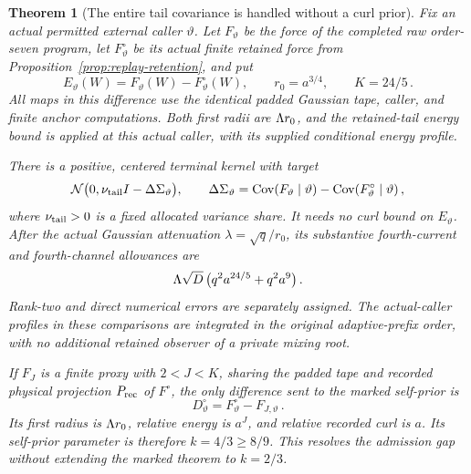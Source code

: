 \documentclass[11pt]{article}
\numberwithin{equation}{section}
\newtheorem{theorem}{Theorem}[section]
\theoremstyle{remark}\newtheorem{remark}[theorem]{Remark}
\newcommand{\N}{\mathcal N}\newcommand{\Cov}{\operatorname{Cov}}
\begin{document}
\begin{theorem}[The entire tail covariance is handled without a curl prior]
\label{thm:tail-admission}
Fix an actual permitted external caller $\vartheta$. Let $F_\vartheta$
be the force of the completed raw order-seven program, let
$F^\circ_\vartheta$ be its actual finite retained force from
Proposition~\ref{prop:replay-retention}, and put
\[
 E_\vartheta(W)=F_\vartheta(W)-F^\circ_\vartheta(W),\qquad
 r_0=a^{3/4},\qquad K=24/5\,.
\]
All maps in this difference use the identical padded Gaussian tape,
caller, and finite anchor computations. Both first radii are
$\Lambda r_0$, and the retained-tail energy bound is applied at this
actual caller, with its supplied conditional energy profile.

There is a positive, centered terminal kernel with target
\begin{equation}\label{eq:tail-cov-target}
 \N\bigl(0,\nu_{\rm tail}I-\Delta\Sigma_\vartheta\bigr),
 \qquad
 \Delta\Sigma_\vartheta
 =\Cov(F_\vartheta\mid\vartheta)
       -\Cov(F^\circ_\vartheta\mid\vartheta)\,,
\end{equation}
where $\nu_{\rm tail}>0$ is a fixed allocated variance share.
It needs no curl bound on $E_\vartheta$. After the actual Gaussian
attenuation $\lambda=\sqrt q/r_0$, its substantive fourth-current
and fourth-channel allowances are
\begin{equation}\label{eq:tail-actual-allowances}
 \Lambda\sqrt D\,\bigl(q^2a^{24/5}+q^2a^9\bigr)\,.
\end{equation}
Rank-two and direct numerical errors are separately assigned.
The actual-caller profiles in these comparisons are integrated in
the original adaptive-prefix order, with no additional retained
observer of a private mixing root.

If $F_J$ is a finite proxy with $2<J<K$, sharing the padded tape
and recorded physical projection $P_{\rm rec}$ of $F^\circ$, the
only difference sent
to the marked self-prior is
\begin{equation}\label{eq:good-curl-self-source}
 D^\circ_\vartheta=F^\circ_\vartheta-F_{J,\vartheta}\,.
\end{equation}
Its first radius is $\Lambda r_0$, relative energy is $a^J$, and
relative recorded curl is $a$. Its self-prior parameter is therefore
$k=4/3\ge8/9$. This resolves the admission gap without extending
the marked theorem to $k=2/3$.
\end{theorem}
\end{document}
